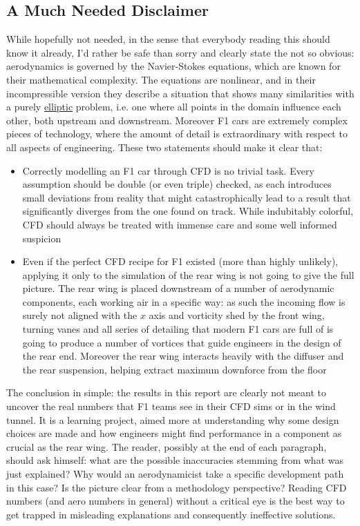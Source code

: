 \documentclass[12pt,a4paper]{article}
\begin{document}
\subsection{A Much Needed Disclaimer}
While hopefully not needed, in the sense that everybody reading this should know it already, I'd rather be safe than sorry and clearly state the not so obvious: aerodynamics is governed by the Navier-Stokes equations, which are known for their mathematical complexity. The equations are nonlinear, and in their incompressible version they describe a situation that shows many similarities with a purely \href{https://cfd.university/learn/10-key-concepts-everyone-must-understand-in-cfd/what-are-hyperbolic-parabolic-and-elliptic-equations-in-cfd}{elliptic} problem, i.e. one where all points in the domain influence each other, both upstream and downstream. Moreover F1 cars are extremely complex pieces of technology, where the amount of detail is extraordinary with respect to all aspects of engineering. These two statements should make it clear that:

\begin{itemize}

    \item Correctly modelling an F1 car through CFD is no trivial task. Every assumption should be double (or even triple) checked, as each introduces small deviations from reality that might catastrophically lead to a result that significantly diverges from the one found on track. While indubitably colorful, CFD should always be treated with immense care and some well informed suspicion
    \item Even if the perfect CFD recipe for F1 existed (more than highly unlikely), applying it only to the simulation of the rear wing is not going to give the full picture. The rear wing is placed downstream of a number of aerodynamic components, each working air in a specific way: as such the incoming flow is surely not aligned with the $x$ axis and vorticity shed by the front wing, turning vanes and all series of detailing that modern F1 cars are full of is going to produce a number of vortices that guide engineers in the design of the rear end. Moreover the rear wing interacts heavily with the diffuser and the rear suspension, helping extract maximum downforce from the floor
\end{itemize}

The conclusion in simple: the results in this report are clearly not meant to uncover the real numbers that F1 teams see in their CFD sims or in the wind tunnel. It is a learning project, aimed more at understanding why some design choices are made and how engineers might find performance in a component as crucial as the rear wing. The reader, possibly at the end of each paragraph, should ask himself: what are the possible inaccuracies stemming from what was just explained? Why would an aerodynamicist take a specific development path in this case? Is the picture clear from a methodology perspective? Reading CFD numbers (and aero numbers in general) without a critical eye is the best way to get trapped in misleading explanations and consequently ineffective solutions.
\end{document}
